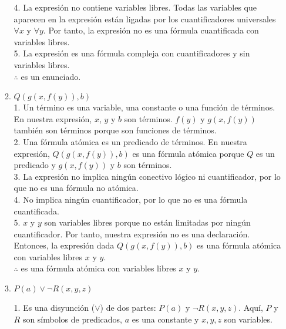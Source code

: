 \documentclass[a4paper,10pt]{article}
\begin{document}
\begin{enumerate}
\begin{enumerate}
4. La expresión no contiene variables libres. Todas las variables que aparecen en la expresión están ligadas por los cuantificadores universales \( \forall x \) y \( \forall y \). Por tanto, la expresión no es una fórmula cuantificada con variables libres.\\

5. La expresión es una fórmula compleja con cuantificadores y sin variables libres.\\

$\therefore$ es un enunciado.

\newpage

  	\item $Q(g(x,f(y)), b)$\\

1. Un término es una variable, una constante o una función de términos. En nuestra expresión, \( x \), \( y \) y \( b \) son términos. \( f(y) \) y \( g(x, f(y)) \) también son términos porque son funciones de términos.\\

2. Una fórmula atómica es un predicado de términos. En nuestra expresión, \( Q(g(x, f (y)), b) \) es una fórmula atómica porque \( Q \) es un predicado y \( g(x, f (y)) \) y \( b \) son términos.\\

3. La expresión no implica ningún conectivo lógico ni cuantificador, por lo que no es una fórmula no atómica.\\

4. No implica ningún cuantificador, por lo que no es una fórmula cuantificada.\\

5. \( x \) y \( y \) son variables libres porque no están limitadas por ningún cuantificador. Por tanto, nuestra expresión no es una declaración.\\

Entonces, la expresión dada \( Q(g(x, f (y)), b) \) es una fórmula atómica con variables libres \( x \) y \( y \).\\

$\therefore$ es una fórmula atómica con variables libres \( x \) y \( y \).\\
\newline

  	\item $P(a) \lor \neg R(x, y, z)$

1. Es una disyunción (\(\lor\)) de dos partes: \(P(a)\) y \(\neg R(x, y, z)\). Aquí, \(P\) y \(R\) son símbolos de predicados, \(a\) es una constante y \(x, y, z\) son variables.\\


\end{enumerate}
\end{enumerate}
\end{document}
